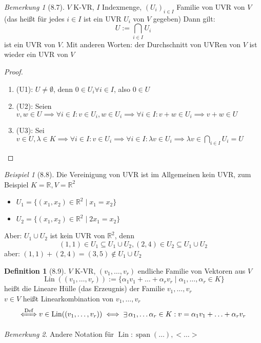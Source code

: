 \documentclass[a4paper]{scrartcl}
\DeclareMathOperator{\Exists}{\exists}
\DeclareMathOperator{\Forall}{\forall}
\DeclareMathOperator{\Lin}{Lin}
\DeclareMathOperator{\Span}{span}
\theoremstyle{definition}
\newtheorem{defn}{Definition}
\theoremstyle{plain}
\theoremstyle{plain}
\theoremstyle{remark}
\newtheorem{remark}{Bemerkung}
\theoremstyle{remark}
\theoremstyle{remark}
\theoremstyle{remark}
\theoremstyle{remark}
\newtheorem{ex}{Beispiel}
\begin{document}
\begin{remark}[8.7]
$V$ K-VR, $I$ Indexmenge, $(U_i)_{i\in I}$ Familie von UVR von $V$ (das heißt für jedes $i\in I$ ist ein UVR $U_i$ von $V$ gegeben)
Dann gilt:
\[U := \bigcap_{i \in I} U_i\]
ist ein UVR von $V$. Mit anderen Worten: der Durchschnitt von UVRen von $V$ ist wieder ein UVR von $V$
\end{remark}
\begin{proof}
\begin{enumerate}
\item (U1): $U \neq \emptyset$, denn $0 \in U_i \Forall i\in I$, also $0 \in U$
\item (U2): Seien $v,w \in U \implies \Forall i \in I: v\in U_i, w \in U_i \implies \Forall i\in I: v + w \in U_i \implies v + w \in U$
\item (U3): Sei $v \in U, \lambda \in K \implies \Forall i\in I: v\in U_i \implies \Forall i\in I: \lambda v \in U_i \implies \lambda v \in \bigcap_{i\in I} U_i = U$
\end{enumerate}
\end{proof}
\begin{ex}[8.8]
Die Vereinigung von UVR ist im Allgemeinen kein UVR, zum Beispiel $K = \mathbb{R}, V =\mathbb{R}^2$
\begin{itemize}
\item $U_1 = \{(x_1, x_2) \in \mathbb{R}^2 \mid x_1 = x_2\}$
\item $U_2 = \{(x_1, x_2) \in \mathbb{R}^2 \mid 2 x_1 = x_2\}$
\end{itemize}
Aber: $U_1 \cup U_2$ ist kein UVR von $\mathbb{R}^2$, denn
\[(1,1) \in U_1 \subseteq U_1 \cup U_2, (2, 4) \in U_2 \subseteq U_1 \cup U_2\]
aber: $(1, 1) + (2, 4) = (3, 5) \not\in U_1 \cup U_2$
\end{ex}
\begin{defn}[8.9]
$V$ K-VR, $(v_1, \ldots, v_r)$ endliche Familie von Vektoren aus $V$
\[\Lin((v_1, \ldots, v_r)) := \{\alpha_1 v_1 + \ldots + \alpha_r v_r \mid \alpha_1, \ldots, \alpha_r \in K\}\]
heißt die Lineare Hülle (das Erzeugnis) der Familie $v_1, \ldots, v_r$ \\
  $v \in V$ heißt Linearkombination von $v_1, \ldots, v_r$
\[\xLeftrightarrow{\text{Def}} v\in \Lin((v_1, \ldots, v_r)) \iff \Exists \alpha_1, \ldots \alpha_r \in K: v = \alpha_1 v_1 + \ldots + \alpha_r v_r\]
\end{defn}
\begin{remark}
Andere Notation für $\Lin: \Span(\ldots), <\ldots>$
\end{remark}
\end{document}
